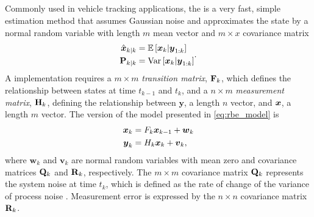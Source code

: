 \subsection{\kf{}}
\label{sec:kf}

Commonly used in vehicle tracking applications, the \kf{} is a very fast, simple estimation method \citep{Anderson_2012} that assumes Gaussian noise and approximates the state by a normal random variable with length $m$ mean vector and $m\times x$ covariance matrix
\begin{equation}
\label{eq:kf_estimators}
\begin{split}
\hat{\boldsymbol x}_{k|k} &= \mathbb{E}\left[\boldsymbol x_k | \boldsymbol{y}_{1:k}\right] \\
\mathbf{P}_{k|k} &= \mathrm{Var}\left[\boldsymbol x_k | \boldsymbol{y}_{1:k}\right]
\end{split}.
\end{equation}
A \kf{} implementation requires a $m\times m$ \emph{transition matrix}, $\mathbf{F}_k$, which defines the relationship between states at time $t_{k-1}$ and $t_k$, and a $n\times m$ \emph{measurement matrix}, $\mathbf{H}_k$, defining the relationship between $\boldsymbol{y}$, a length $n$ vector, and $\boldsymbol x$, a length $m$ vector. The \kf{} version of the model presented in \cref{eq:rbe_model} is
\begin{equation}
\label{eq:kf_model}
\begin{split}
\boldsymbol x_k &= F_k\boldsymbol x_{k-1} + \boldsymbol{w}_k \\
\boldsymbol{y}_k &= H_k\boldsymbol x_k + \boldsymbol{v}_k,
\end{split}
\end{equation}
where $\boldsymbol{w}_k$ and $\boldsymbol{v}_k$ are normal random variables with mean zero and covariance matrices $\mathbf{Q}_k$ and $\mathbf{R}_k$, respectively. The $m\times m$ covariance matrix $\mathbf{Q}_k$ represents the system noise at time $t_k$, which is defined as the rate of change of the variance of process noise \citep{Cathey_2003}. Measurement error is expressed by the $n\times n$ covariance matrix $\mathbf{R}_k$.

